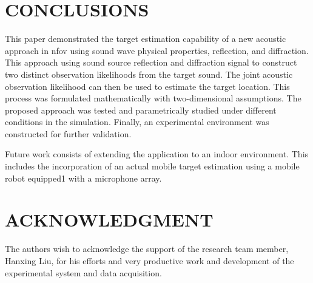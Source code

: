 \documentclass[letterpaper, 10 pt, conference]{ieeeconf}  %
\begin{document}
\section{CONCLUSIONS}
This paper demonstrated the target estimation capability of a new acoustic approach in \gls{nfov} using sound wave physical properties, reflection, and diffraction. This approach using sound source reflection and diffraction signal to construct two distinct observation likelihoods from the target sound. The joint acoustic observation likelihood can then be used to estimate the target location. This process was formulated mathematically with two-dimensional assumptions. The proposed approach was tested and parametrically studied under different conditions in the simulation. Finally, an experimental environment was constructed for further validation.

Future work consists of extending the application to an indoor environment. This includes the incorporation of an actual mobile target estimation using a mobile robot equipped1 with a microphone array.
                                  
            
\section*{ACKNOWLEDGMENT}
The authors wish to acknowledge the support of the research team member, Hanxing Liu, for his efforts and very productive work and development of the experimental system and data acquisition.
\end{document}
